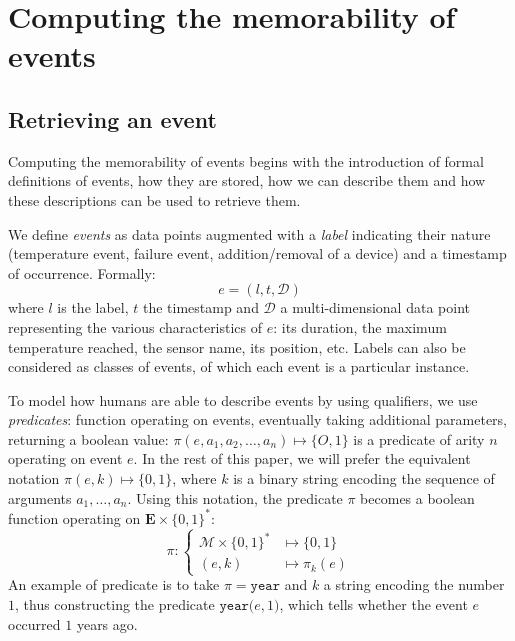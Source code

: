 \documentclass[conference]{IEEEtran}
\begin{document}
\section{Computing the memorability of events}
\label{sec:computing}
\subsection{Retrieving an event}

Computing the memorability of events begins with the introduction of formal definitions of events, how they are stored, how we can describe them and how these descriptions can be used to retrieve them.

We define \emph{events} as data points augmented with a \emph{label} indicating their nature (temperature event, failure event, addition/removal of a device) and a timestamp of occurrence. Formally:
\begin{equation}
  \label{eq:event}
  e = (l, t,\mathcal{D})
\end{equation}
where $l$ is the label, $t$ the timestamp and $\mathcal{D}$ a multi-dimensional data point representing the various characteristics of $e$: its duration, the maximum temperature reached, the sensor name, its position, etc. Labels can also be considered as classes of events, of which each event is a particular instance.

To model how humans are able to describe events by using qualifiers, we use \emph{predicates}: function operating on events, eventually taking additional parameters, returning a boolean value: $\pi(e, a_1, a_2, \dots, a_n) \mapsto \{O,1\}$ is a predicate of arity $n$ operating on event $e$. In the rest of this paper, we will prefer the equivalent notation $\pi(e, k) \mapsto \{0,1\}$, where $k$ is a binary string encoding the sequence of arguments $a_1, \dots, a_n$. Using this notation, the predicate $\pi$ becomes a boolean function operating on $\mathbf{E} \times \{0,1\}^*$:
\begin{equation}
  \label{eq:predicate}
  \pi : \begin{cases}
    \mathcal{M}\times \{0,1\}^{*} &\mapsto \{0,1\} \\
    (e, k) &\mapsto \pi_{k}(e)
    \end{cases}
\end{equation}
An example of predicate is to take $\pi = \mathtt{year}$ and $k$ a string encoding the number $1$, thus
constructing the predicate $\mathtt{year(}e, 1\mathtt{)}$, which tells whether
the event $e$ occurred $1$ years ago.
\end{document}
